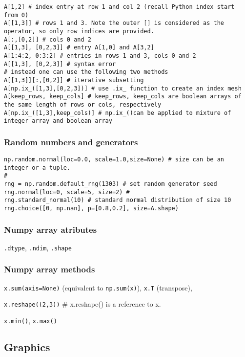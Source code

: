 \documentclass[
  letterpaper,
  DIV=11,
  numbers=noendperiod]{scrreprt}
\begin{document}
\begin{verbatim}
A[1,2] # index entry at row 1 and col 2 (recall Python index start from 0)
A[[1,3]] # rows 1 and 3. Note the outer [] is considered as the operator, so only row indices are provided. 
A[:,[0,2]] # cols 0 and 2
A[[1,3], [0,2,3]] # entry A[1,0] and A[3,2]
A[1:4:2, 0:3:2] # entries in rows 1 and 3, cols 0 and 2
A[[1,3], [0,2,3]] # syntax error
# instead one can use the following two methods 
A[[1,3]][:,[0,2]] # iterative subsetting
A[np.ix_([1,3],[0,2,3])] # use .ix_ function to create an index mesh
A[keep_rows, keep_cols] # keep_rows, keep_cols are boolean arrays of the same length of rows or cols, respectively
A[np.ix_([1,3],keep_cols)] # np.ix_()can be applied to mixture of integer array and boolean array
\end{verbatim}

\subsubsection{Random numbers and
generators}\label{random-numbers-and-generators}

\begin{verbatim}
np.random.normal(loc=0.0, scale=1.0,size=None) # size can be an integer or a tuple.
# 
rng = np.random.default_rng(1303) # set random generator seed
rng.normal(loc=0, scale=5, size=2) # 
rng.standard_normal(10) # standard normal distribution of size 10
rng.choice([0, np.nan], p=[0.8,0.2], size=A.shape)
\end{verbatim}

\subsubsection{Numpy array atributes}\label{numpy-array-atributes}

\texttt{.dtype}, \texttt{.ndim}, \texttt{.shape}

\subsubsection{Numpy array methods}\label{numpy-array-methods}

\texttt{x.sum(axis=None)} (equivalent to \texttt{np.sum(x)}),
\texttt{x.T} (transpose),

\texttt{x.reshape((2,3))} \# x.reshape() is a reference to x.

\texttt{x.min()}, \texttt{x.max()}

\subsection{Graphics}\label{graphics}
\end{document}
